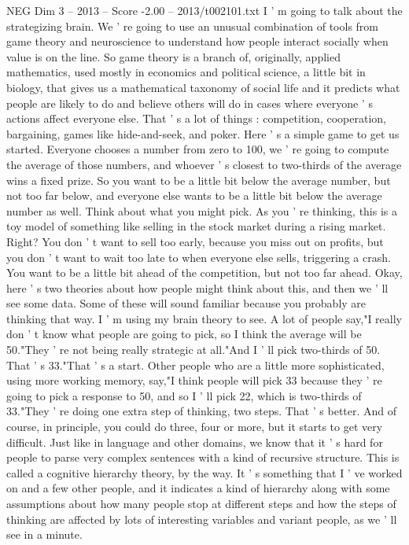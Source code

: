 \begin{textsample}{NEG Dim 3 – 2013 – Score -2.00 – 2013/t002101.txt}  \label{ex:f3_neg_031}
I ' m going to talk about the strategizing brain.
We ' re going to use an unusual combination of tools from game theory and neuroscience to understand how people interact socially when value is on the line.
So game theory is a branch of, originally, applied mathematics, used mostly in economics and political science, a little bit in biology, that gives us a mathematical taxonomy of social life and it predicts what people are likely to do and believe others will do in cases where everyone ' s actions affect everyone else.
That ' s a lot of things : competition, cooperation, bargaining, games like hide-and-seek, and poker.
Here ' s a simple game to get us started.
Everyone chooses a number from zero to 100, we ' re going to compute the average of those numbers, and whoever ' s closest to two-thirds of the average wins a fixed prize.
So you want to be a little bit below the average number, but not too far below, and everyone else wants to be a little bit below the average number as well.
Think about what you might pick.
As you ' re thinking, this is a toy model of something like selling in the stock market during a rising market.
Right?
You don ' t want to sell too early, because you miss out on profits, but you don ' t want to wait too late to when everyone else sells, triggering a crash.
You want to be a little bit ahead of the competition, but not too far ahead.
Okay, here ' s two theories about how people might think about this, and then we ' ll see some data.
Some of these will sound familiar because you probably are thinking that way.
I ' m using my brain theory to see.
A lot of people say,"I really don ' t know what people are going to pick, so I think the average will be 50."They ' re not being really strategic at all."And I ' ll pick two-thirds of 50.
That ' s 33."That ' s a start.
Other people who are a little more sophisticated, using more working memory, say,"I think people will pick 33 because they ' re going to pick a response to 50, and so I ' ll pick 22, which is two-thirds of 33."They ' re doing one extra step of thinking, two steps.
That ' s better.
And of course, in principle, you could do three, four or more, but it starts to get very difficult.
Just like in language and other domains, we know that it ' s hard for people to parse very complex sentences with a kind of recursive structure.
This is called a cognitive hierarchy theory, by the way.
It ' s something that I ' ve worked on and a few other people, and it indicates a kind of hierarchy along with some assumptions about how many people stop at different steps and how the steps of thinking are affected by lots of interesting variables and variant people, as we ' ll see in a minute.

\end{textsample}
